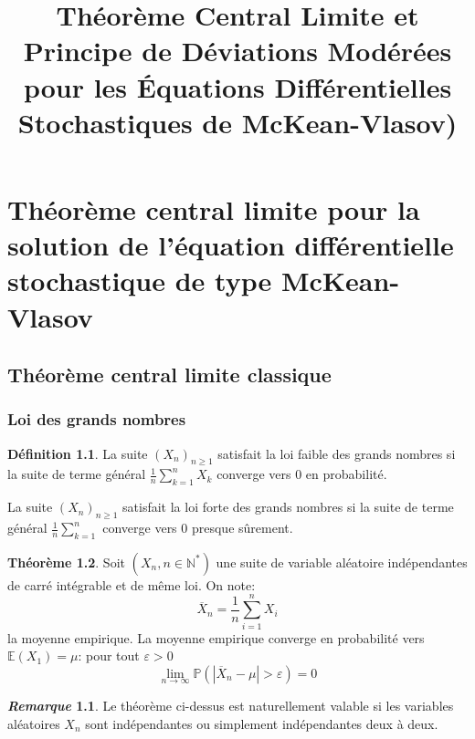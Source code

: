 \documentclass[12pt,a4paper,twoside,fleqn]{book}%
\title{ \textbf{Théorème Central Limite et Principe de Déviations Modérées pour les Équations Différentielles Stochastiques de McKean-Vlasov)}}
\theoremstyle{definition}
\newtheorem{dfn}{Définition}[section]
\newtheorem{rem}{\textit{Remarque}}[section]
\newtheorem{thm}[dfn]{Théorème}
\theoremstyle{lemme}
\numberwithin{equation}{section}
\begin{document}
	\pagestyle{plain}
	\newpage
	\tableofcontents
	\newpage
	
	
	\chapter{Théorème central limite pour la solution de l'équation différentielle stochastique de type McKean-Vlasov}
	  \section{Théorème central limite classique}
	 \subsection{Loi des grands nombres}
	  \begin{dfn}
	  	La suite $(X_n)_{n\geq 1}$ satisfait la loi faible des grands nombres si la suite de terme général $\frac{1}{n}\sum_{k=1}^{n}X_k$ converge vers 0 en probabilité.
	  	
	  	La suite $(X_n)_{n\geq1}$ satisfait la loi forte des grands nombres si la suite de terme général $\frac{1}{n}\sum_{k=1}^{n}$ converge vers 0 presque sûrement.
	  \end{dfn}	
	\begin{thm}
		Soit $(X_n, n\in\mathbb{N}^*)$ une suite de variable aléatoire indépendantes de carré intégrable et de même loi. On note:
		\[
		\overline{X}_n=\frac{1}{n}\sum_{i=1}^{n}X_i
		\] la moyenne empirique. La moyenne empirique converge en probabilité vers $\mathbb{E}(X_1)=\mu$: pour tout $\varepsilon>0$
		\begin{equation}\label{eq:2.1.1}
			\lim_{n \to \infty} \mathbb{P}\left(|\overline{X}_n - \mu|>\varepsilon\right)=0
		\end{equation}
		
\end{thm}
\begin{rem}
	Le théorème ci-dessus est naturellement valable si les variables aléatoires $X_n$ sont indépendantes ou simplement indépendantes deux à deux.
\end{rem}
\end{document}

